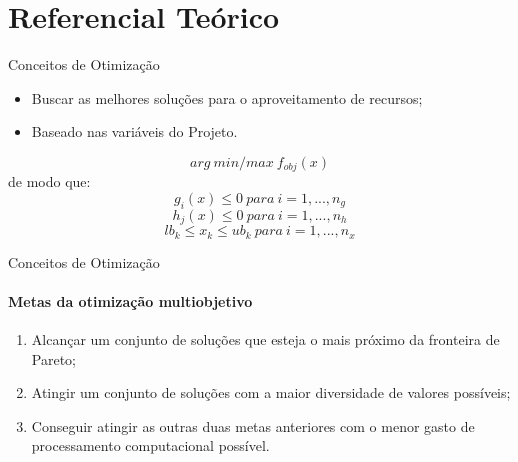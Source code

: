\documentclass[]{beamer}
\begin{document}
\section{Referencial Teórico}
\begin{frame}{Conceitos de Otimização}

	\begin{itemize}
	\item Buscar as melhores soluções para o aproveitamento de recursos;
	\item Baseado nas variáveis do Projeto. 
	\end{itemize}

	\begin{equation}\label{equacao:otimizacao}
		{ arg \ {min/max} \ f_{obj}(x)  }
	\end{equation}
	de modo que:
	\begin{equation}\label{equacao:otimizacao_II}
		{ g_{i}(x) \leq 0 \ para \ i = 1,...,n_{g} }
	\end{equation}
	\begin{equation}\label{equacao:otimizacao_III}
		{ h_{j}(x) \leq 0 \ para \ i = 1,...,n_{h} }
	\end{equation}
	\begin{equation}\label{equacao:otimizacao_IV}
		{ lb_{k} \leq x_{k} \leq ub_{k} \ para \ i = 1,...,n_{x} }
	\end{equation}

\end{frame}

\begin{frame}{Conceitos de Otimização}
	\framesubtitle{Metas da otimização multiobjetivo}
	
	\begin{enumerate}
		\item Alcançar um conjunto de soluções que esteja o mais próximo da fronteira de Pareto;
		\item Atingir um conjunto de soluções com a maior diversidade de valores possíveis;
		\item Conseguir atingir as outras duas metas anteriores com o menor gasto de processamento computacional possível.
	\end{enumerate}
		
\end{frame}
\end{document}
